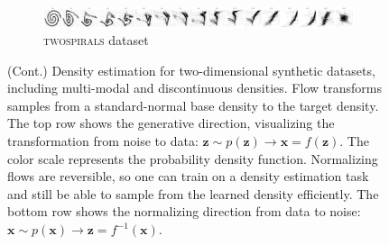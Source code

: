 \begin{figure}[!htb]
\begin{center}
\begin{subfigure}{\linewidth}
      \includegraphics[width=\linewidth,trim=0cm 0cm 0cm 1.6cm, clip]{figures/2D/TWOSPIRALS/plot_normalizing_flow_evolution.png}
      \caption{\textsc{twospirals} dataset}
      \label{fig:NF_2D_TWOSPIRALS}
    \end{subfigure}
  \vspace{-2em}
  \caption{(Cont.) Density estimation for two-dimensional synthetic datasets, including multi-modal and discontinuous densities. Flow transforms samples from a standard-normal base density to the target density. The top row shows the generative direction, visualizing the transformation from noise to data: $\mathbf{z} \sim p(\mathbf{z}) \rightarrow \mathbf{x} = f(\mathbf{z})$. 
  The color scale represents the probability density function. 
  Normalizing flows are reversible, so one can train on a density estimation task and still be able to sample from the learned density efficiently. 
  The bottom row shows the normalizing direction from data to noise: $\mathbf{x} \sim p(\mathbf{x}) \rightarrow \mathbf{z} = f^{-1}(\mathbf{x})$.}
  \label{fig:nf_2d_examples:1}
\end{center}
\end{figure}

